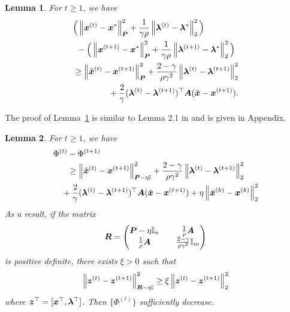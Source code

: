 \documentclass[twocolumn,amsthm]{autart}%
\theoremstyle{definition}
\theoremstyle{plain}
\newtheorem{lemma}{Lemma}
\begin{document}
\begin{lemma}
\label{lem:first-ineq}
For $t \ge 1$, we have
\begin{equation}
\label{eq:lem1a}
\begin{multlined}
\Big( \norm{\bbsym{x}^{(t)}-\bbsym{x}^{*}}^2_{\bbsym{P}}
+ \frac{1}{\gamma \rho} \norm{\bbsym{\lambda}^{(t)}-\bbsym{\lambda}^{*}}_2^2 \Big) \\
- \Big(\norm{\bbsym{x}^{(t+1)}-\bbsym{x}^{*}}^2_{\bbsym{P}}
+ \frac{1}{\gamma \rho} \norm{\bbsym{\lambda}^{(t+1)}-\bbsym{\lambda}^{*}}_2^2 \Big) \\
\ge \norm{\xtil^{(t)}-\bbsym{x}^{(t+1)}}_{\bbsym{P}}^2
+ \frac{2-\gamma}{\rho \gamma^2} \norm{\bbsym{\lambda}^{(t)}-\bbsym{\lambda}^{(t+1)}}_2^2 \\
+ \frac{2}{\gamma} (\bbsym{\lambda}^{(t)}-\bbsym{\lambda}^{(t+1)})^\top \bbsym{A} (\xtil-\bbsym{x}^{(t+1)}).
\end{multlined}
\end{equation}
\end{lemma}

The proof of Lemma~\ref{lem:first-ineq} is similar to Lemma 2.1 in \cite{deng2017parallel} and is given in Appendix.

\begin{lemma}
For $t \ge 1$, we have
\begin{equation}
\label{eq:fcn_decrease}
\begin{multlined}
\Phi^{(t)} - \Phi^{(t+1)}  \\
\ge \norm{\xtil^{(t)}-\bbsym{x}^{(t+1)}}_{\bbsym{P}-\eta \II}^2
+ \frac{2-\gamma}{\rho \gamma^2} \norm{\bbsym{\lambda}^{(t)}-\bbsym{\lambda}^{(t+1)}}_2^2 \\
+ \frac{2}{\gamma} (\bbsym{\lambda}^{(t)}-\bbsym{\lambda}^{(t+1)})^\top \bbsym{A} (\xtil-\bbsym{x}^{(t+1)})
+ \eta \norm{\xtil^{(k)}-\bbsym{x}^{(k)}}_2^2
\end{multlined}
\end{equation}
As a result, if the matrix 
\begin{equation}
\boldsymbol{R} = 
\begin{pmatrix}
\boldsymbol{P} - \eta \mathbb{I}_n & \quad \frac{1}{\rho} \boldsymbol{A} \\
\frac{1}{\rho} \boldsymbol{A} & \quad \frac{2-\gamma}{\rho \gamma^2} \mathbb{I}_m \\
\end{pmatrix}
\end{equation}
is positive definite, there exists $\xi > 0$ such that 
\begin{equation}
\left\lVert \boldsymbol{z}^{(t)} - \boldsymbol{z}^{(t+1)} \right\rVert_{\boldsymbol{R} - \eta \mathbb{I}}^2 \ge \xi  \left\lVert \boldsymbol{z}^{(t)} - \boldsymbol{z}^{(t+1)} \right\rVert_2^2
\end{equation}
where $\boldsymbol{z}^\top = [\boldsymbol{x}^\top, \boldsymbol{\lambda}^\top]$.
Then $\{\Phi^{(t)}\}$ sufficiently decrease.
\end{lemma}
\end{document}
